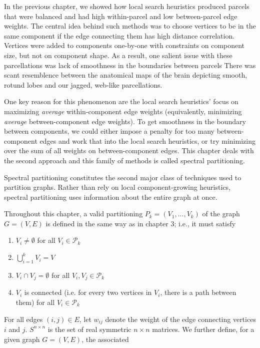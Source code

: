 In the previous chapter, we showed how local search heuristics produced
parcels that were balanced and had high within-parcel and low
between-parcel edge weights. The central idea behind such methods
was to choose vertices to be in the same component if the edge
connecting them has high distance correlation. Vertices were added to
components one-by-one with constraints on component size, but not on
component shape. As a result, one salient issue with these
parcellations was lack of smoothness in the boundaries between parcels
There was scant resemblence between the anatomical maps
of the brain depicting smooth, rotund lobes and our jagged, web-like
parcellations.

One key reason for this phenomenon are the local search heuristics'
focus on maximizing \textit{average} within-component edge weights
(equivalently, minimizing \textit{average} between-component edge
weights). To get smoothness in the boundary between components, we
could either impose a penalty for too many between-component edges and
work that into the local search heuristics, or try minimizing over the
sum of all weights on between-component edges. This chapter deals with
the second approach and this family of methods is called spectral
partitioning.

Spectral partitioning constitutes the second major class of techniques
used to partition graphs. Rather than rely on local component-growing
heuristics, spectral partitioning uses information about the entire
graph at once.

Throughout this chapter, a valid partitioning
$P_k = (V_1, ..., V_k)$ of the graph $G = (V, E)$ is defined in the
same way as in chapter 3; i.e., it must satisfy

\begin{enumerate}[1.]
\item
$V_i \neq \emptyset$ for all $V_i \in \mathcal{P}_k$

\item
$\bigcup\limits_{i=1}^k V_i = V$

\item
$V_i \cap V_j = \emptyset$ for all $V_i, V_j \in \mathcal{P}_k$

\item
$V_i$ is connected (i.e. for every two vertices in $V_i$, there is a
path between them) for all $V_i \in \mathcal{P}_k$
\end{enumerate}

For all edges $(i,j) \in E$, let $w_{ij}$ denote the weight of the edge
connecting vertices $i$ and $j$.
$S^{n \times n}$ is the set of real symmetric $n \times n$ matrices.
We further define, for a given graph $G = (V, E)$, the associated

